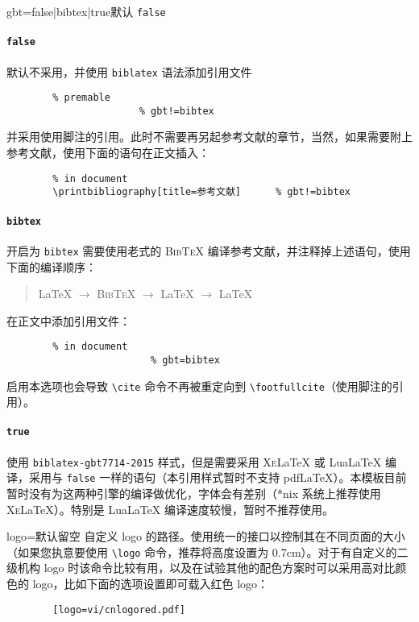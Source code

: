 \documentclass[a4paper,12pt]{article}
\begin{document}
\begin{CJK}{UTF8}{song}
\begin{docKey*}[SJTUBeamermin]{gbt}{=false|bibtex|true}{默认 \texttt{false}}
    \paragraph{\texttt{false}} 默认不采用，并使用 \verb"biblatex" 语法添加引用文件
    \begin{verbatim}
        % premable
                       % gbt!=bibtex
    \end{verbatim}
    并采用使用脚注的引用。此时不需要再另起参考文献的章节，当然，如果需要附上参考文献，使用下面的语句在正文插入：
    \begin{verbatim}
        % in document
        \printbibliography[title=参考文献]      % gbt!=bibtex
    \end{verbatim}
    \paragraph{\texttt{bibtex}} 开启为 \verb"bibtex" 需要使用老式的 \textsc{Bib\TeX{}} 编译参考文献，并注释掉上述语句，使用下面的编译顺序：
    \begin{quotation}
        \LaTeX{} $\rightarrow$ \textsc{Bib\TeX{}} $\rightarrow$ \LaTeX{} $\rightarrow$ \LaTeX{}
    \end{quotation}
    在正文中添加引用文件：
    \begin{verbatim}
        % in document
                         % gbt=bibtex
    \end{verbatim}
    启用本选项也会导致 \verb"\cite" 命令不再被重定向到 \verb"\footfullcite"（使用脚注的引用）。
    \paragraph{\texttt{true}} 使用 \verb"biblatex-gbt7714-2015" 样式，但是需要采用 \textsc{Xe}\LaTeX{} 或 Lua\LaTeX{} 编译，采用与 \verb"false" 一样的语句（本引用样式暂时不支持 pdf\LaTeX{}）。本模板目前暂时没有为这两种引擎的编译做优化，字体会有差别（*nix 系统上推荐使用\textsc{Xe}\LaTeX{}）。特别是 Lua\LaTeX{} 编译速度较慢，暂时不推荐使用。 
\end{docKey*}

\begin{docKey*}[SJTUBeamermin]{logo}{=}{默认留空}
    自定义 logo 的路径。使用统一的接口以控制其在不同页面的大小（如果您执意要使用 \verb"\logo" 命令，推荐将高度设置为 0.7cm）。对于有自定义的二级机构 logo 时该命令比较有用，以及在试验其他的配色方案时可以采用高对比颜色的 logo，比如下面的选项设置即可载入红色 logo：
    \begin{verbatim}
        [logo=vi/cnlogored.pdf]
    \end{verbatim}
\end{docKey*}


\end{CJK}
\end{document}
